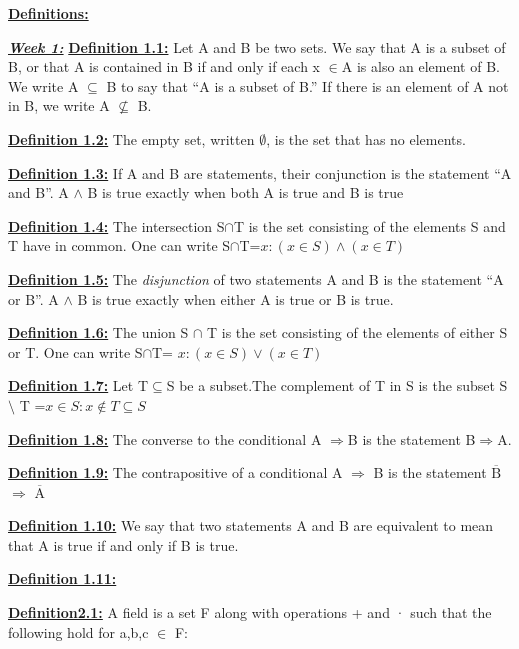 \documentclass[10pt]{article}
\title{}
\begin{document}
\fontsize{14}{10}\textbf{\underline{Definitions:}}
\par

\fontsize{12}{10}
\textbf{\textit{\underline{Week 1:}}}
\textbf{\underline{Definition 1.1:}}
Let A and B be two sets. We say that A is a subset of B, or that A is contained
in B if and only if each x $ \in $A is also an element of B. We write  A $ \subseteq $ B to say that “A is a
subset of B.” If there is an element of A not in B, we write A $ \nsubseteq $ B.
\par


\textbf{\underline{Definition 1.2:}}
The empty set, written $ \emptyset $, is the set that has no elements.
\par


\textbf{\underline{Definition 1.3:}}
If A and B are statements, their conjunction is the statement “A and B”.
A $ \wedge $ B is true exactly when both A is true and B is true
\par
\textbf{\underline{Definition 1.4:}}
The intersection S$\cap $T is the set consisting of the
elements S and T have in common. One can write S$ \cap $T=${x:(x \in S)\wedge(x \in T)}$
\par
\textbf{\underline{Definition 1.5:}}
The \textit{disjunction} of two statements A and B is the statement “A or B”. A $\wedge $ B is true exactly 
when either A is true or B is true.
\par
\textbf{\underline{Definition 1.6:}}
The union S $ \cap $ T is the set consisting of the elements
of either S or T. One can write S$\cap$T= ${x:(x\in S)\vee(x\in T)}$
\par
\textbf{\underline{Definition 1.7:}}
Let T$ \subseteq $S be a subset.The complement of T in S is
the subset S $ \setminus $ T =${x\in S:x \notin T} \subseteq S $
\par
\textbf{\underline{Definition 1.8:}}
The converse to the conditional A $ \Rightarrow $B is the statement B$ \Rightarrow $A.
\par
\textbf{\underline{Definition 1.9:}}
The contrapositive of a conditional A $ \Rightarrow $ B is the statement  $ \overline{\mbox{B}} $  $ \Rightarrow $ $\overline{\mbox{A}}$ 
\par
\textbf{\underline{Definition 1.10:}}
We say that two statements A and B are equivalent to mean that A is true
if and only if B is true.
\par
\textbf{\underline{Definition 1.11:}}
\par
\textbf{\underline{Definition2.1:}}
A field is a set F along with operations + and · such that the following hold for a,b,c $\in$ F:
\end{document}

